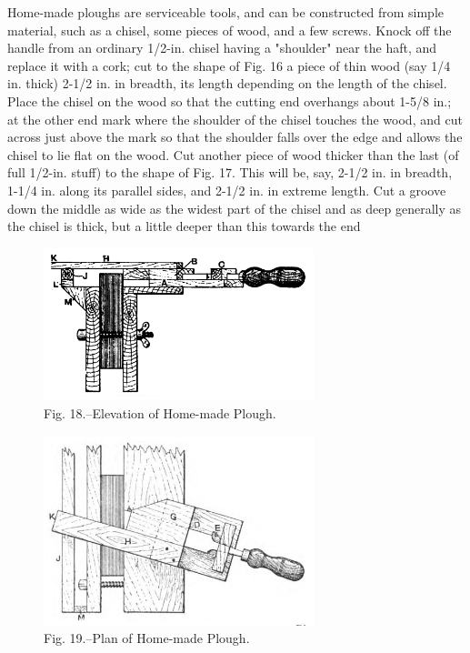 \documentclass[twoside]{book}
\begin{document}
Home-made ploughs are serviceable tools, and
can be constructed from simple material, such as a
chisel, some pieces of wood, and a few screws.
Knock off the handle from an ordinary 1/2-in. chisel
having a "shoulder" near the haft, and replace it
with a cork; cut to the shape of Fig. 16 a piece of
thin wood (say 1/4 in. thick) 2-1/2 in. in breadth, its
length depending on the length of the chisel. Place
the chisel on the wood so that the cutting end overhangs
about 1-5/8 in.; at the other end mark where
the shoulder of the chisel touches the wood, and cut
across just above the mark so that the shoulder falls
over the edge and allows the chisel to lie flat on
the wood. Cut another piece of wood thicker than
the last (of full 1/2-in. stuff) to the shape of Fig. 17.
\pagebreak
This will be, say, 2-1/2 in. in breadth, 1-1/4 in. along its
parallel sides, and 2-1/2 in. in extreme length. Cut a
groove down the middle as wide as the widest part
of the chisel and as deep generally as the chisel is
thick, but a little deeper than this towards the end
	\begin{figure}[h]
		\centering
		\includegraphics[width=0.7\textwidth]{Figures/_018.png}
		\caption*{Fig. 18.--Elevation of Home-made Plough.}
	\end{figure}	
	\begin{figure}[h]
		\centering
		\includegraphics[width=0.7\textwidth]{Figures/_019.png}
		\caption*{Fig. 19.--Plan of Home-made Plough.}
	\end{figure}
\end{document}
